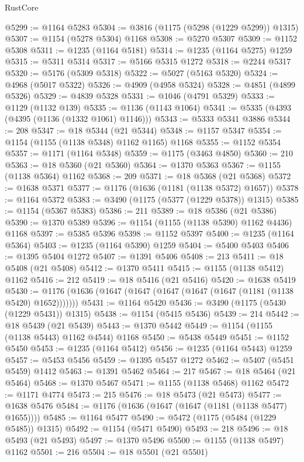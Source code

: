 \begin{lexlean}{RustCore}
\begin{coremodule}
@5299 := @1164 @5283
@5304 := @3816 (@1175 (@5298 (@1229 @5299)) @1315)
@5307 := @1154 (@5278 @5304) @1168
@5308 := @5270 @5307
@5309 := @1152 @5308
@5311 := @1235 (@1164 @5181)
@5314 := @1235 (@1164 @5275) @1259
@5315 := @5311 @5314
@5317 := @5166 @5315 @1272
@5318 := @2244 @5317
@5320 := @5176 (@5309 @5318)
@5322 := @5027 (@5163 @5320)
@5324 := @4968 (@5017 @5322)
@5326 := @4909 (@4958 @5324)
@5328 := @4851 (@4899 @5326)
@5329 := @4839 @5328
@5331 := @1046 (@4791 @5329)
@5333 := @1129 (@1132 @139)
@5335 := @1136 (@1143 @1064)
@5341 := @5335 (@4393 (@4395 (@1136 (@1332 @1061) @1146)))
@5343 := @5333 @5341 @3886
@5344 := 208
@5347 := @18 @5344 (@21 @5344)
@5348 := @1157 @5347
@5354 := @1154 (@1155 (@1138 @5348) @1162 @1165) @1168
@5355 := @1152 @5354
@5357 := @1171 (@1164 @5348)
@5359 := @1175 (@3463 @4850)
@5360 := 210
@5363 := @18 @5360 (@21 @5360)
@5364 := @1370 @5363
@5367 := @1155 (@1138 @5364) @1162
@5368 := 209
@5371 := @18 @5368 (@21 @5368)
@5372 := @1638 @5371
@5377 := @1176 (@1636 (@1181 (@1138 @5372) @1657))
@5378 := @1164 @5372
@5383 := @3490 (@1175 (@5377 (@1229 @5378)) @1315)
@5385 := @1154 (@5367 @5383)
@5386 := 211
@5389 := @18 @5386 (@21 @5386)
@5390 := @1370 @5389
@5396 := @1154 (@1155 (@1138 @5390) @1162 @4436) @1168
@5397 := @5385 @5396
@5398 := @1152 @5397
@5400 := @1235 (@1164 @5364)
@5403 := @1235 (@1164 @5390) @1259
@5404 := @5400 @5403
@5406 := @1395 @5404 @1272
@5407 := @1391 @5406
@5408 := 213
@5411 := @18 @5408 (@21 @5408)
@5412 := @1370 @5411
@5415 := @1155 (@1138 @5412) @1162
@5416 := 212
@5419 := @18 @5416 (@21 @5416)
@5420 := @1638 @5419
@5430 := @1176 (@1636 (@1647 (@1647 (@1647 (@1647 (@1647 (@1181 (@1138 @5420) @1652)))))))
@5431 := @1164 @5420
@5436 := @3490 (@1175 (@5430 (@1229 @5431)) @1315)
@5438 := @1154 (@5415 @5436)
@5439 := 214
@5442 := @18 @5439 (@21 @5439)
@5443 := @1370 @5442
@5449 := @1154 (@1155 (@1138 @5443) @1162 @4544) @1168
@5450 := @5438 @5449
@5451 := @1152 @5450
@5453 := @1235 (@1164 @5412)
@5456 := @1235 (@1164 @5443) @1259
@5457 := @5453 @5456
@5459 := @1395 @5457 @1272
@5462 := @5407 (@5451 @5459) @1412
@5463 := @1391 @5462
@5464 := 217
@5467 := @18 @5464 (@21 @5464)
@5468 := @1370 @5467
@5471 := @1155 (@1138 @5468) @1162
@5472 := @1171 @4774
@5473 := 215
@5476 := @18 @5473 (@21 @5473)
@5477 := @1638 @5476
@5484 := @1176 (@1636 (@1647 (@1647 (@1181 (@1138 @5477) @1655))))
@5485 := @1164 @5477
@5490 := @5472 (@1175 (@5484 (@1229 @5485)) @1315)
@5492 := @1154 (@5471 @5490)
@5493 := 218
@5496 := @18 @5493 (@21 @5493)
@5497 := @1370 @5496
@5500 := @1155 (@1138 @5497) @1162
@5501 := 216
@5504 := @18 @5501 (@21 @5501)

\end{coremodule}
\end{lexlean}
